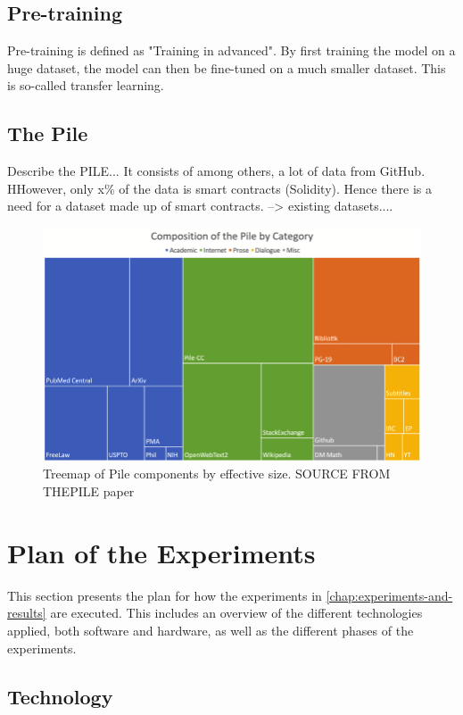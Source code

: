 \subsection{Pre-training}
Pre-training is defined as "Training in advanced". By first training the model on a huge dataset, the model can then be fine-tuned on a much smaller dataset. This is so-called transfer learning.

\subsection{The Pile}
\label{sec:the-pile}
Describe the  PILE...  It consists of among others, a lot of data from GitHub. HHowever, only x\% of the data is smart contracts (Solidity). Hence there is a need for a dataset made up of smart contracts. --> existing datasets....

\begin{figure}[htp]
    \centering
    \includegraphics[width=\textwidth]{figures/Treemap-of-Pile-components-by-effective-size.png}
    \caption{Treemap of Pile components by effective size. SOURCE FROM THEPILE paper}
    \label{fig:flowchart}
\end{figure}


\section{Plan of the Experiments}
This section presents the plan for how the experiments in \cref{chap:experiments-and-results} are executed. This includes an overview of the different technologies applied, both software and hardware, as well as the different phases of the experiments.

\subsection{Technology}
\label{sec:technology}

